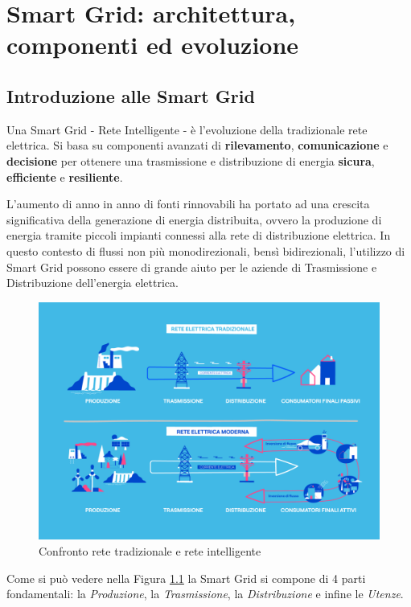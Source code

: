\newpage
\chapter{Smart Grid: architettura, componenti ed evoluzione}

\section{Introduzione alle Smart Grid}



Una Smart Grid - Rete Intelligente - è l'evoluzione della tradizionale rete elettrica. Si basa su componenti avanzati di \textbf{rilevamento}, \textbf{comunicazione} e \textbf{decisione} per ottenere una trasmissione e distribuzione di energia \textbf{sicura}, \textbf{efficiente} e \textbf{resiliente}. \cite{en15186799}


L'aumento di anno in anno di fonti rinnovabili ha portato ad una crescita significativa della generazione di energia distribuita, ovvero la produzione di energia tramite piccoli impianti connessi alla rete di distribuzione elettrica. In questo contesto di flussi non più monodirezionali, bensì bidirezionali, l'utilizzo di Smart Grid possono essere di grande aiuto per le aziende di Trasmissione e Distribuzione dell'energia elettrica. \cite{Enel}


\begin{figure}[h!]
    \centering
    \includegraphics[width=0.8\linewidth]{img/Smart-Grid-EDistribuzione2.png}
    \caption{Confronto rete tradizionale e rete intelligente}
    \label{fig:TraditionalGridVSSmartrGrid}
\end{figure}


Come si può vedere nella Figura \ref{fig:TraditionalGridVSSmartrGrid} la Smart Grid si compone di 4 parti fondamentali: la \textit{Produzione}, la 
\textit{Trasmissione}, la \textit{Distribuzione} e infine le \textit{Utenze}.

